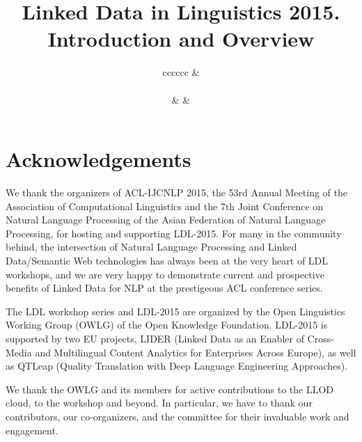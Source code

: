 \documentclass[11pt]{article}
\title{Linked Data in Linguistics 2015. Introduction and Overview}
\author{
\setlength{\tabcolsep}{0pt}
\begin{tabular}{cccccc}
	\multicolumn{3}{l}{
		\begin{tabular}{c}
			Christian Chiarcos \\
			{\normalfont Goethe-Universität Frankfurt, Germany}\\
			{\tt chiarcos@uni-frankfurt.de} \\
		\end{tabular}
	}	&
	\multicolumn{3}{r}{
		\begin{tabular}{c}
			Philipp Cimiano\\
			{\normalfont Universität Bielefeld, Germany}\\
			{\tt cimiano@cit-ec.uni-bielefeld.de}\\ 
		\end{tabular}
	} \\\\
	\multicolumn{1}{c}{
		\begin{tabular}{c}
		  Nancy Ide\\
		  {\normalfont Vassar College, NY}\\
		  {\tt ide@cs.vassar.edu}\\
		\end{tabular}
	} & 
	\multicolumn{3}{c}{
		\begin{tabular}{c}
		  John P. McCrae \\
		  {\normalfont Universität Bielefeld, Germany}\\
		  {\tt jmcrae@cit-ec.uni-bielefeld.de}\\ 
		\end{tabular}
	} &
	\multicolumn{2}{c}{
		\begin{tabular}{c}
		  Petya Osenova\\
		  {\normalfont University of Sofia, Bulgaria}\\
		  {\tt petya@bultreebank.org}	
		\end{tabular}
	}
\end{tabular}
\setlength{\tabcolsep}{6pt} %
}
\date{}
\begin{document}
\maketitle






\section*{Acknowledgements}

We thank the organizers of ACL-IJCNLP 2015, the 53rd Annual Meeting of the Association of Computational Linguistics and the 7th Joint Conference on Natural Language Processing of the Asian Federation of Natural Language Processing, for hosting and supporting LDL-2015. 
For many in the community behind, the intersection of Natural Language Processing and Linked Data/Semantic Web technologies has always been at the very heart of LDL workshops, and we are very happy to demonstrate current and prospective benefits of Linked Data for NLP at the prestigeous ACL conference series.

The LDL workshop series and LDL-2015 are organized by the Open Linguistics Working Group (OWLG) of the Open Knowledge Foundation. LDL-2015 is supported by two EU projects, LIDER (Linked Data as an Enabler of Cross-Media and Multilingual Content Analytics for Enterprises Across Europe), as well as QTLeap (Quality Translation with Deep Language Engineering Approaches).

We thank the OWLG and its members for active contributions to the LLOD cloud, to the workshop and beyond. In particular, we have to thank our contributors, our co-organizers, and the committee for their invaluable work and engagement. 




\newpage
\end{document}

